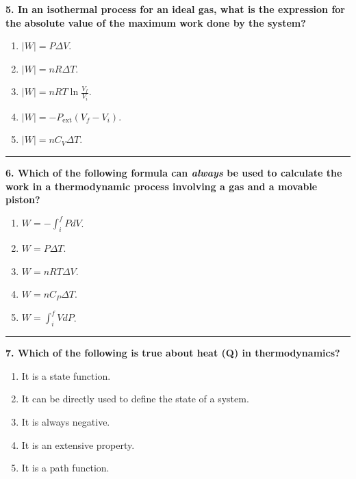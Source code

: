 \documentclass[
  9pt,
]{extbook}
\providecommand{\tightlist}{%
  \setlength{\itemsep}{0pt}\setlength{\parskip}{0pt}}
\theoremstyle{definition}
\theoremstyle{definition}
\theoremstyle{definition}
\theoremstyle{remark}
\begin{document}
\textbf{5. In an isothermal process for an ideal gas, what is the expression for the absolute value of the maximum work done by the system?}

\begin{enumerate}
\def\labelenumi{\alph{enumi}.}
\tightlist
\item
  \(\left| W \right|=P\Delta V\).
\item
  \(\left| W \right|=nR \Delta T\).
\item
  \(\left| W \right|=nRT\ln\frac{V_f}{V_i}\).
\item
  \(\left| W \right|=-P_{\text{ext}}(V_f-V_i)\).
\item
  \(\left| W \right|=nC_V \Delta T\).
\end{enumerate}

\begin{center}\rule{0.5\linewidth}{0.5pt}\end{center}

\textbf{6. Which of the following formula can \emph{always} be used to calculate the work in a thermodynamic process involving a gas and a movable piston?}

\begin{enumerate}
\def\labelenumi{\alph{enumi}.}
\tightlist
\item
  \(W= - \int_{i}^{f} PdV\).
\item
  \(W = P \Delta T\).
\item
  \(W = nRT \Delta V\).
\item
  \(W = nC_P \Delta T\).
\item
  \(W = \int_{i}^{f} VdP\).
\end{enumerate}

\begin{center}\rule{0.5\linewidth}{0.5pt}\end{center}

\textbf{7. Which of the following is true about heat (Q) in thermodynamics?}

\begin{enumerate}
\def\labelenumi{\alph{enumi}.}
\tightlist
\item
  It is a state function.
\item
  It can be directly used to define the state of a system.
\item
  It is always negative.
\item
  It is an extensive property.
\item
  It is a path function.
\end{enumerate}
\end{document}
